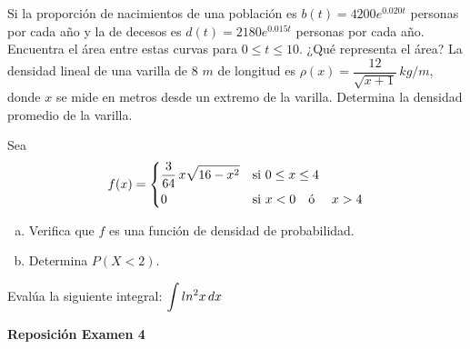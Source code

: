 \documentclass[12pt]{exam}
\begin{document}
\begin{questions}
        \question Si la proporción de nacimientos de una población es $b(t)=4200e^{0.020t}$ personas por cada año y la de decesos es $d(t)=2180e^{0.015t}$ personas por cada año. Encuentra el área entre estas curvas para $0\leq t\leq 10$. ¿Qué representa el área?
\vskip12pt
        \question La densidad lineal de una varilla de 8 $m$ de longitud es $\rho(x)=\dfrac{12}{\sqrt{x+1}} \, kg/m$, donde $x$ se mide en metros desde un extremo de la varilla. Determina la densidad promedio de la varilla. 
\vskip12pt

    \question 
    Sea $$ f(x) = \begin{dcases} \dfrac{3}{64}\,x\sqrt{16-x^2} & \text{si } 0 \leq x \leq 4 \\ 0 & \text{si } x < 0 \quad \text{ó }\quad  x > 4 \end{dcases}$$
    \begin{enumerate}[a)]
    \item Verifica que $f$ es una función de densidad de probabilidad.
    \item Determina $P(X<2)$.
\end{enumerate}
 \vskip12pt       
\question Evalúa la siguiente integral:   
    $\mathlarger{\int ln^2x\,dx}$
    
\end{questions}{}

\vskip30pt

\begin{center}
\Large 
\textbf{Reposición Examen 4}
\end{center}{}
\normalsize
\end{document}
